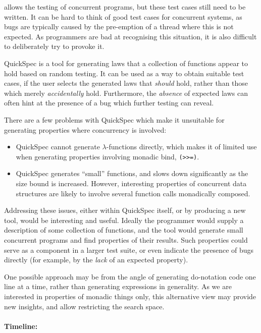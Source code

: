\dejafu{} allows the testing of concurrent programs, but these test
cases still need to be written. It can be hard to think of good test
cases for concurrent systems, as bugs are typically caused by the
pre-emption of a thread where this is not expected. As programmers are
bad at recognising this situation, it is also difficult to
deliberately try to provoke it.

QuickSpec \citep{quickspec} is a tool for generating laws that a
collection of functions appear to hold based on random testing. It can
be used as a way to obtain suitable test cases, if the user selects
the generated laws that \emph{should} hold, rather than those which
merely \emph{accidentally} hold. Furthermore, the \emph{absence} of
expected laws can often hint at the presence of a bug which further
testing can reveal.

There are a few problems with QuickSpec which make it unsuitable for
generating properties where concurrency is involved:

\begin{itemize}
\item QuickSpec cannot generate $\lambda$-functions directly, which
  makes it of limited use when generating properties involving monadic
  bind, \verb|(>>=)|.

\item QuickSpec generates ``small'' functions, and slows down
  significantly as the size bound is increased. However, interesting
  properties of concurrent data structures are likely to involve
  several function calls monadically composed.
\end{itemize}

Addressing these issues, either within QuickSpec itself, or by
producing a new tool, would be interesting and useful. Ideally the
programmer would supply a description of some collection of functions,
and the tool would generate small concurrent programs and find
properties of their results. Such properties could serve as a
component in a larger test suite, or even indicate the presence of
bugs directly (for example, by the \emph{lack} of an expected
property).

One possible approach may be from the angle of generating do-notation
code one line at a time, rather than generating expressions in
generality. As we are interested in properties of monadic things only,
this alternative view may provide new insights, and allow restricting
the search space.

\paragraph{Timeline:}

